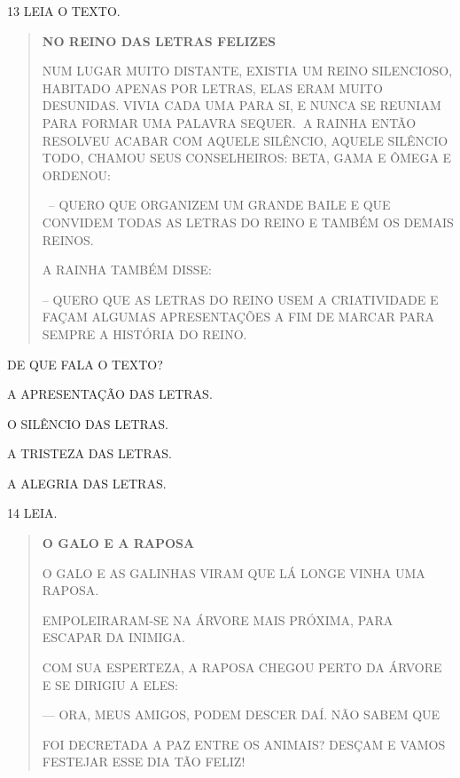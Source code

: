 \num{13} LEIA O TEXTO.

\begin{quote}
\textbf{NO REINO DAS LETRAS FELIZES}

NUM LUGAR MUITO DISTANTE, EXISTIA UM REINO SILENCIOSO, HABITADO APENAS
POR LETRAS, ELAS ERAM MUITO DESUNIDAS. VIVIA CADA UMA PARA SI, E NUNCA
SE REUNIAM PARA FORMAR UMA PALAVRA SEQUER.\textbf{~}A RAINHA ENTÃO
RESOLVEU ACABAR COM AQUELE SILÊNCIO, AQUELE SILÊNCIO TODO, CHAMOU SEUS
CONSELHEIROS: BETA, GAMA E ÔMEGA E ORDENOU:

~-- QUERO QUE ORGANIZEM UM GRANDE BAILE E QUE CONVIDEM TODAS AS LETRAS
DO REINO E TAMBÉM OS DEMAIS REINOS.

A RAINHA TAMBÉM DISSE:

-- QUERO QUE AS LETRAS DO REINO USEM A CRIATIVIDADE E FAÇAM ALGUMAS
APRESENTAÇÕES A FIM DE MARCAR PARA SEMPRE A HISTÓRIA DO REINO.
\end{quote}


DE QUE FALA O TEXTO?

\begin{escolha}
\item A APRESENTAÇÃO DAS LETRAS.

\item O SILÊNCIO DAS LETRAS.

\item A TRISTEZA DAS LETRAS. 

\item A ALEGRIA DAS LETRAS.
\end{escolha}

\num{14} LEIA.

\begin{quote}
\textbf{O GALO E A RAPOSA}

O GALO E AS GALINHAS VIRAM QUE LÁ LONGE VINHA UMA RAPOSA.

EMPOLEIRARAM-SE NA ÁRVORE MAIS PRÓXIMA, PARA ESCAPAR DA INIMIGA.

COM SUA ESPERTEZA, A RAPOSA CHEGOU PERTO DA ÁRVORE E
SE DIRIGIU A ELES:

--- ORA, MEUS AMIGOS, PODEM DESCER DAÍ. NÃO SABEM QUE

FOI DECRETADA A PAZ ENTRE OS ANIMAIS? DESÇAM E VAMOS FESTEJAR ESSE
DIA TÃO FELIZ!
\end{quote}


